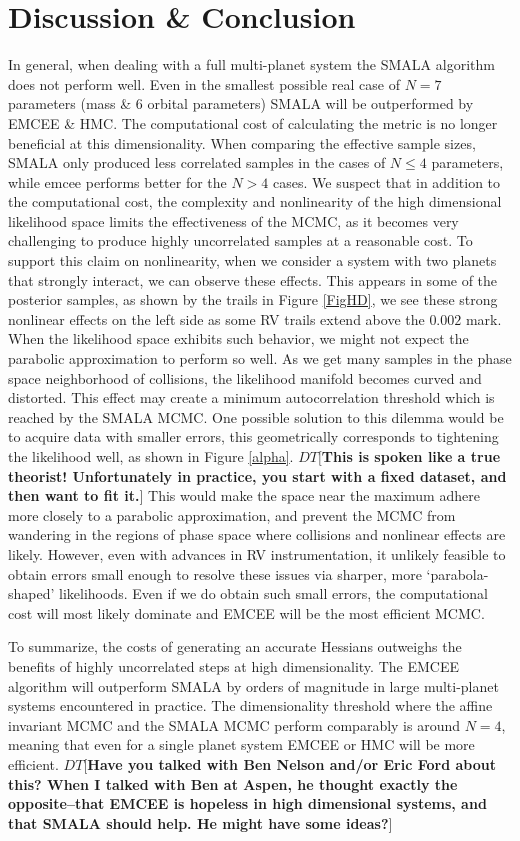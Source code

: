 \documentclass{aa}
\def\memodt#1{\color{green}$DT[${\bf #1}$]$ \color{black}}
\begin{document}
\section{Discussion \& Conclusion}
In general, when dealing with a full multi-planet system the SMALA algorithm does not perform well. 
Even in the smallest possible real case of $N=7$ parameters (mass \& 6 orbital parameters) SMALA will be outperformed by EMCEE \& HMC. 
The computational cost of calculating the metric is no longer beneficial at this dimensionality. 
When comparing the effective sample sizes, SMALA only produced less correlated samples in the cases of $N \leq 4$ parameters, while emcee performs better for the $N>4$ cases. 
We suspect that in addition to the computational cost, the complexity and nonlinearity of the high dimensional likelihood space limits the effectiveness of the MCMC, as it becomes very challenging to produce highly uncorrelated samples at a reasonable cost. 
To support this claim on nonlinearity, when we consider a system with two planets that strongly interact, we can observe these effects. 
This appears in some of the posterior samples, as shown by the trails in Figure \ref{FigHD}, we see these strong nonlinear effects on the left side as some RV trails extend above the $0.002$ mark. 
When the likelihood space exhibits such behavior, we might not expect the parabolic approximation to perform so well. 
As we get many samples in the phase space neighborhood of collisions, the likelihood manifold becomes curved and distorted. 
This effect may create a minimum autocorrelation threshold which is reached by the SMALA MCMC. 
One possible solution to this dilemma would be to acquire data with smaller errors, this geometrically corresponds to tightening the likelihood well, as shown in Figure \ref{alpha}. \memodt{This is spoken like a true theorist! Unfortunately in practice, you start with a fixed dataset, and then want to fit it.}
This would make the space near the maximum adhere more closely to a parabolic approximation, and prevent the MCMC from wandering in the regions of phase space where collisions and nonlinear effects are likely. 
However, even with advances in RV instrumentation, it unlikely feasible to obtain errors small enough to resolve these issues via sharper, more `parabola-shaped' likelihoods. 
Even if we do obtain such small errors, the computational cost will most likely dominate and EMCEE will be the most efficient MCMC.

To summarize, the costs of generating an accurate Hessians outweighs the benefits of highly uncorrelated steps at high dimensionality. 
The EMCEE algorithm will outperform SMALA by orders of magnitude in large multi-planet systems encountered in practice. 
The dimensionality threshold where the affine invariant MCMC and the SMALA MCMC perform comparably is around $N = 4$, meaning that even for a single planet system EMCEE or HMC will be more efficient.
\memodt{Have you talked with Ben Nelson and/or Eric Ford about this? When I talked with Ben at Aspen, he thought exactly the opposite--that EMCEE is hopeless in high dimensional systems, and that SMALA should help. He might have some ideas?}
\end{document}
